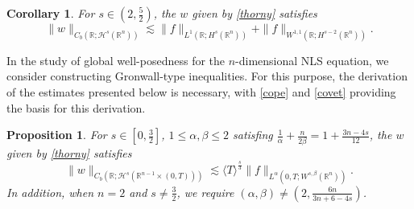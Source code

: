 \documentclass[preprint,compress,12pt]{elsarticle}
\newtheorem{corollary}[theorem]{Corollary}
\newtheorem{proposition}[theorem]{Proposition}
\numberwithin{equation}{section}
\begin{document}
\begin{corollary}
	For $s\in\left(2,\frac{5}{2}\right)$,  the $w$ given by \eqref{thorny} satisfies
	\begin{equation}\label{perilous} \|w\|_{C_{b}(\mathbb{R};\mathcal{H}^{s}(\mathbb{R}^{n}))}\lesssim\|f\|_{L^{1}(\mathbb{R};H^{s}(\mathbb{R}^{n}))}+\|f\|_{W^{1,1}(\mathbb{R};H^{s-2}(\mathbb{R}^{n}))}.
	\end{equation}
\end{corollary}

In the study of global well-posedness for the $n$-dimensional NLS equation, we consider constructing Gronwall-type inequalities. For this purpose, the derivation of the estimates presented below is necessary, with \eqref{cope} and \eqref{covet} providing the basis for this derivation.
\begin{proposition}\label{p33}
	For $s\in\left[0,\frac{3}{2}\right]$, $1\leq \alpha,\beta\leq 2$ satisfing $\frac{1}{\alpha}+\frac{n}{2\beta}=1+\frac{3n-4s}{12}$,  the $w$ given by \eqref{thorny} satisfies
	\begin{equation}\label{taowuji}
		\|w\|_{C_{b}(\mathbb{R};\mathcal{H}^{s}(\mathbb{R}^{n-1}\times(0,T)))}\lesssim\langle T\rangle^{\frac{s}{3}}\|f\|_{L^{\alpha}(0,T;W^{s,\beta}(\mathbb{R}^{n}))}.
	\end{equation}
	In addition, when  $n=2$ and $s\neq\frac{3}{2}$, we require $\left(\alpha,\beta\right)\neq \left(2,\frac{6n}{3n+6-4s}\right)$.
\end{proposition}
\end{document}
